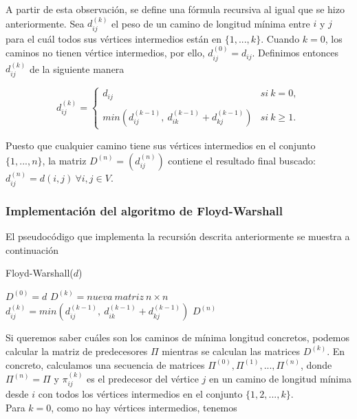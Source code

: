 A partir de esta observación, se define una fórmula recursiva al igual que se hizo anteriormente. Sea $d_{ij}^{(k)}$ el peso de un camino de longitud mínima entre $i$ y $j$ para el cuál todos sus vértices intermedios están en $\{1,...,k\}$. Cuando $k=0$, los caminos no tienen vértice intermedios, por ello, $d_{ij}^{(0)}=d_{ij}$. Definimos entonces $d_{ij}^{(k)}$ de la siguiente manera

$$d_{ij}^{(k)}= \left\{ \begin{array}{lcc}
	d_{ij} &   si\ k=0, \\
	\\ min(d_{ij}^{(k-1)},\ d_{ik}^{(k-1)}+d_{kj}^{(k-1)}) & si\ k\geq 1.
\end{array}
\right.$$

Puesto que cualquier camino tiene sus vértices intermedios en el conjunto $\{1,...,n\}$, la matriz $D^{(n)}=(d_{ij}^{(n)})$ contiene el resultado final buscado: $d_{ij}^{(n)}=d(i,j)\ \forall i,j\in V.$

\subsubsection{Implementación del algoritmo de Floyd-Warshall}

El pseudocódigo que implementa la recursión descrita anteriormente se muestra a continuación

\begin{breakablealgorithm}
	\caption{Floyd-Warshall($d$)}
	\begin{algorithmic}[1]
		\State $D^{(0)}=d$
			\State $D^{(k)}=nueva\ matriz\ n\times n$
					\State $d_{ij}^{(k)}=min(d_{ij}^{(k-1)},\ d_{ik}^{(k-1)}+d_{kj}^{(k-1)})$
				\EndFor
			\EndFor
		\EndFor
		\Return $D^{(n)}$
	\end{algorithmic}
\end{breakablealgorithm}

Si queremos saber cuáles son los caminos de mínima longitud concretos, podemos calcular la matriz de predecesores $\Pi$ mientras se calculan las matrices $D^{(k)}$. En concreto, calculamos una secuencia de matrices $\Pi^{(0)},\Pi^{(1)},...,\Pi^{(n)}$, donde $\Pi^{(n)}=\Pi$ y $\pi_{ij}^{(k)}$ es el predecesor del vértice $j$ en un camino de longitud mínima desde $i$ con todos los vértices intermedios en el conjunto $\{1,2,...,k\}$. \\

Para $k=0$, como no hay vértices intermedios, tenemos

